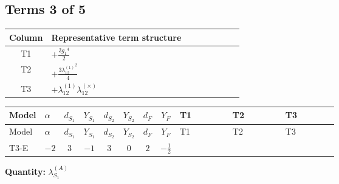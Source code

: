 \documentclass[8pt]{article}
\begin{document}
\begin{landscape}
\subsection*{Terms 3 of 5}
\begin{center}
\begin{tabular}{@{}c >{\raggedright\arraybackslash}p{0.82\linewidth}@{}}
\toprule
Column & Representative term structure \\
\midrule
T1 & \(\displaystyle +\frac{3 {g_1}^4}{2}\) \\
\midrule
T2 & \(\displaystyle +\frac{3 {\lambda_{12}^{(1)}}^2}{4}\) \\
\midrule
T3 & \(\displaystyle +{\lambda_{12}^{(1)}} {\lambda_{12}^{(\times)}}\) \\
\midrule
\bottomrule
\end{tabular}
\end{center}
\smallskip
\tiny
\begin{longtable}{@{}llcccccc >{\raggedright\arraybackslash}p{0.21\linewidth} >{\raggedright\arraybackslash}p{0.21\linewidth} >{\raggedright\arraybackslash}p{0.21\linewidth}@{}}
\toprule
Model & $\alpha$ & $d_{S_1}$ & $Y_{S_1}$ & $d_{S_2}$ & $Y_{S_2}$ & $d_F$ & $Y_F$ & T1 & T2 & T3 \\
\midrule
\endfirsthead
\toprule
Model & $\alpha$ & $d_{S_1}$ & $Y_{S_1}$ & $d_{S_2}$ & $Y_{S_2}$ & $d_F$ & $Y_F$ & T1 & T2 & T3 \\
\midrule
\endhead
T3-E & $-2$ & $3$ & $-1$ & $3$ & $0$ & $2$ & $-\frac{1}{2}$ & \scriptsize\adjustbox{max width=\linewidth}{$\begin{gathered} +\frac{3 {g_1}^4}{2}\end{gathered}$} & \scriptsize\adjustbox{max width=\linewidth}{$\begin{gathered} +\frac{3 {\lambda_{12}^{(1)}}^2}{4}\end{gathered}$} & \scriptsize\adjustbox{max width=\linewidth}{$\begin{gathered} +{\lambda_{12}^{(1)}} {\lambda_{12}^{(\times)}}\end{gathered}$} \\
\midrule
\bottomrule
\end{longtable}
\clearpage
\noindent\textbf{Quantity: }$\lambda_{S_1}^{(A)}$\par\smallskip

\end{landscape}
\end{document}
